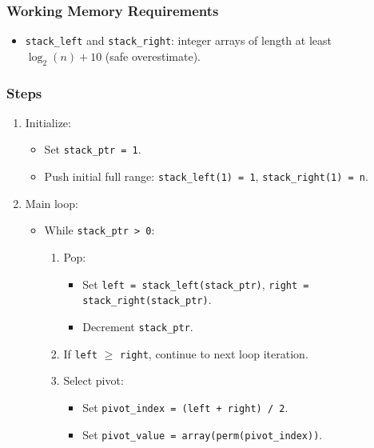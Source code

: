 \documentclass{article}
\begin{document}
\subsubsection{Working Memory Requirements}

\begin{itemize}
    \item \texttt{stack\_left} and \texttt{stack\_right}: integer arrays of length at least \(\log_2(n) + 10\) (safe overestimate).
\end{itemize}

\subsubsection{Steps}

\begin{enumerate}
    \item Initialize:
    \begin{itemize}
        \item Set \texttt{stack\_ptr = 1}.
        \item Push initial full range: \texttt{stack\_left(1) = 1}, \texttt{stack\_right(1) = n}.
    \end{itemize}
    
    \item Main loop:
    \begin{itemize}
        \item While \texttt{stack\_ptr > 0}:
        \begin{enumerate}
            \item Pop:
            \begin{itemize}
                \item Set \texttt{left = stack\_left(stack\_ptr)}, \texttt{right = stack\_right(stack\_ptr)}.
                \item Decrement \texttt{stack\_ptr}.
            \end{itemize}
            \item If \texttt{left} \(\geq\) \texttt{right}, continue to next loop iteration.
            
            \item Select pivot:
            \begin{itemize}
                \item Set \texttt{pivot\_index = (left + right) / 2}.
                \item Set \texttt{pivot\_value = array(perm(pivot\_index))}.
            \end{itemize}
            

\end{enumerate}
\end{itemize}
\end{enumerate}
\end{document}
